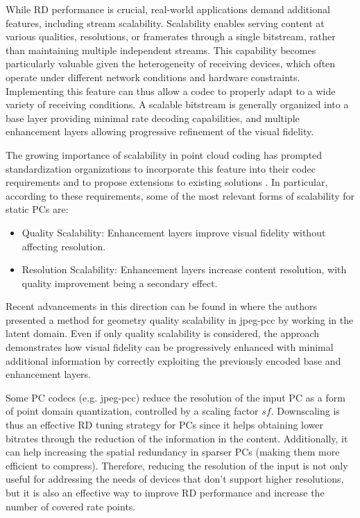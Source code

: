 While RD performance is crucial, real-world applications demand additional features, including stream scalability. Scalability enables serving content at various qualities, resolutions, or framerates through a single bitstream, rather than maintaining multiple independent streams. This capability becomes particularly valuable given the heterogeneity of receiving devices, which often operate under different network conditions and hardware constraints. Implementing this feature can thus allow a codec to properly adapt to a wide variety of receiving conditions.
A scalable bitstream is generally organized into a base layer providing minimal rate decoding capabilities, and multiple enhancement layers allowing progressive refinement of the visual fidelity.

The growing importance of scalability in point cloud coding has prompted standardization organizations to incorporate this feature into their codec requirements \cite{jpeg-pleno-cttc} and to propose extensions to existing solutions \cite{vpccscal}. In particular, according to these requirements, some of the most relevant forms of scalability for static PCs are:
\begin{itemize}
    \item Quality Scalability: Enhancement layers improve visual fidelity without affecting resolution.
    \item Resolution Scalability: Enhancement layers increase content resolution, with quality improvement being a secondary effect.
\end{itemize}

Recent advancements in this direction can be found in \cite{mari2024point} 
where the authors presented a method for geometry quality scalability in \gls{jpeg-pcc} by working in the latent domain. Even if only quality scalability is considered, the approach demonstrates how visual fidelity can be progressively enhanced with minimal additional information by correctly exploiting the previously encoded base and enhancement layers.

Some PC codecs (e.g. \gls{jpeg-pcc}) reduce the resolution of the input PC as a form of point domain quantization, controlled by a scaling factor $sf$. Downscaling is thus an effective RD tuning strategy for PCs since it helps obtaining lower bitrates through the reduction of the information in the content. Additionally, it can help increasing the spatial redundancy in sparser PCs (making them more efficient to compress). Therefore, reducing the resolution of the input is not only useful for addressing the needs of devices that don't support higher resolutions, but it is also an effective way to improve RD performance and increase the number of covered rate points. 

